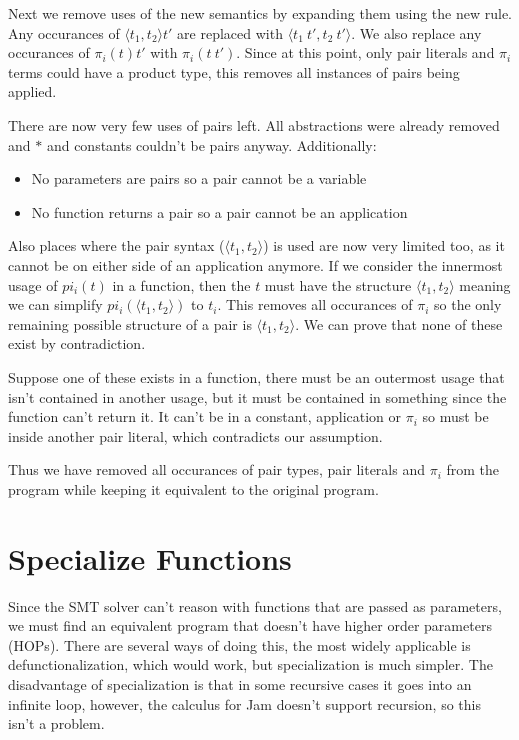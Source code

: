 \documentclass[12pt,a4paper,titlepage]{article}
\begin{document}
    Next we remove uses of the new semantics by expanding them using the new rule.
    Any occurances of $\langle t_1, t_2 \rangle t'$ are replaced with $\langle t_1\ t', t_2\ t' \rangle$.
    We also replace any occurances of $\pi_i(t) t'$ with $\pi_i(t\ t')$.
    Since at this point, only pair literals and $\pi_i$ terms could have a product type, this removes
    all instances of pairs being applied.

    There are now very few uses of pairs left.
    All abstractions were already removed and $\ast$ and constants couldn't be pairs anyway.
    Additionally:
    \begin{itemize}
        \item No parameters are pairs so a pair cannot be a variable
        \item No function returns a pair so a pair cannot be an application
    \end{itemize}

    Also places where the pair syntax ($\langle t_1, t_2 \rangle$) is used are now very limited too, as
    it cannot be on either side of an application anymore.
    If we consider the innermost usage of $pi_i(t)$ in a function, then the $t$ must have the structure
    $\langle t_1, t_2 \rangle$ meaning we can simplify $pi_i(\langle t_1, t_2 \rangle)$ to $t_i$.
    This removes all occurances of $\pi_i$ so the only remaining possible structure of a pair is
    $\langle t_1, t_2 \rangle$. We can prove that none of these exist by contradiction.

    Suppose one of these exists in a function, there must be an outermost usage that isn't contained in another
    usage, but it must be contained in something since the function can't return it. It can't be in a constant,
    application or $\pi_i$ so must be inside another pair literal, which contradicts our assumption.

    Thus we have removed all occurances of pair types, pair literals and $\pi_i$ from the program while keeping
    it equivalent to the original program.

    \section{Specialize Functions}
    Since the SMT solver can't reason with functions that are passed as parameters, we must find an equivalent
    program that doesn't have higher order parameters (HOPs).
    There are several ways of doing this, the most widely applicable is defunctionalization, which would work,
    but specialization is much simpler.
    The disadvantage of specialization is that in some recursive cases it goes into an infinite loop, however,
    the calculus for Jam doesn't support recursion, so this isn't a problem.
\end{document}
